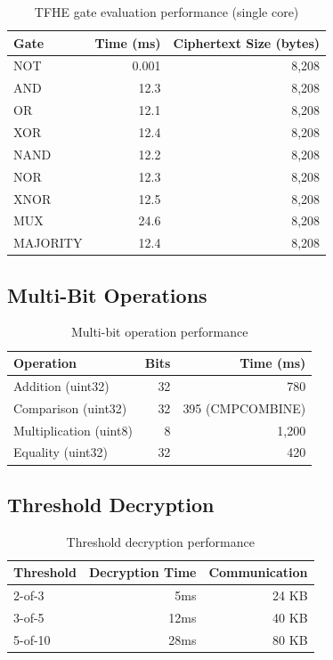 \documentclass[11pt,a4paper]{article}
\begin{document}
\begin{table}[h]
\centering
\begin{tabular}{@{}lrr@{}}
\toprule
\textbf{Gate} & \textbf{Time (ms)} & \textbf{Ciphertext Size (bytes)} \\
\midrule
NOT & 0.001 & 8,208 \\
AND & 12.3 & 8,208 \\
OR & 12.1 & 8,208 \\
XOR & 12.4 & 8,208 \\
NAND & 12.2 & 8,208 \\
NOR & 12.3 & 8,208 \\
XNOR & 12.5 & 8,208 \\
MUX & 24.6 & 8,208 \\
MAJORITY & 12.4 & 8,208 \\
\bottomrule
\end{tabular}
\caption{TFHE gate evaluation performance (single core)}
\label{tab:gate-perf}
\end{table}

\subsection{Multi-Bit Operations}

\begin{table}[h]
\centering
\begin{tabular}{@{}lrr@{}}
\toprule
\textbf{Operation} & \textbf{Bits} & \textbf{Time (ms)} \\
\midrule
Addition (uint32) & 32 & 780 \\
Comparison (uint32) & 32 & 395 (CMPCOMBINE) \\
Multiplication (uint8) & 8 & 1,200 \\
Equality (uint32) & 32 & 420 \\
\bottomrule
\end{tabular}
\caption{Multi-bit operation performance}
\label{tab:multibit}
\end{table}

\subsection{Threshold Decryption}

\begin{table}[h]
\centering
\begin{tabular}{@{}lrr@{}}
\toprule
\textbf{Threshold} & \textbf{Decryption Time} & \textbf{Communication} \\
\midrule
2-of-3 & 5ms & 24 KB \\
3-of-5 & 12ms & 40 KB \\
5-of-10 & 28ms & 80 KB \\
\bottomrule
\end{tabular}
\caption{Threshold decryption performance}
\label{tab:threshold-perf}
\end{table}
\end{document}
